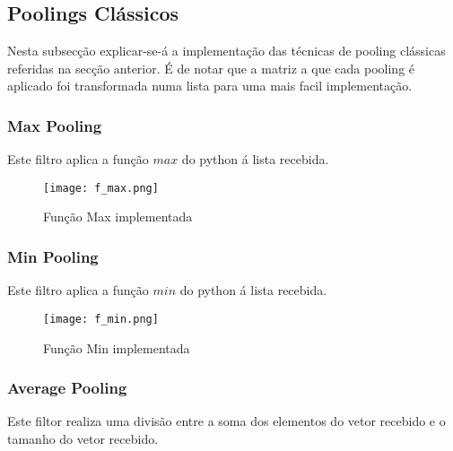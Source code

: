 \subsection{Poolings Clássicos}

 Nesta subsecção explicar-se-á a implementação das técnicas de pooling clássicas referidas na secção anterior. É de notar que a matriz a que cada pooling é aplicado foi transformada numa lista para uma mais facil implementação.


\subsubsection{Max Pooling}\hfill\newline
	\hfill\newline
	Este filtro aplica a função $max$ do python á lista recebida.

	\begin{figure}[H]

	  \centering
	  \captionsetup{justification=centering}

	  \texttt{[image: f\_max.png]}
	  
	  \caption {Função Max implementada}
	\end{figure}

\subsubsection{Min Pooling}\hfill\newline
	\hfill\newline

	Este filtro aplica a função $min$ do python á lista recebida.

	\begin{figure}[H]

	  \centering
	  \captionsetup{justification=centering}

	  \texttt{[image: f\_min.png]}
	  
	  \caption {Função Min implementada}
	\end{figure}

\subsubsection{Average Pooling}\hfill\newline
	\hfill\newline

	Este filtor realiza uma divisão entre a soma dos elementos do vetor recebido e o tamanho do vetor recebido.


